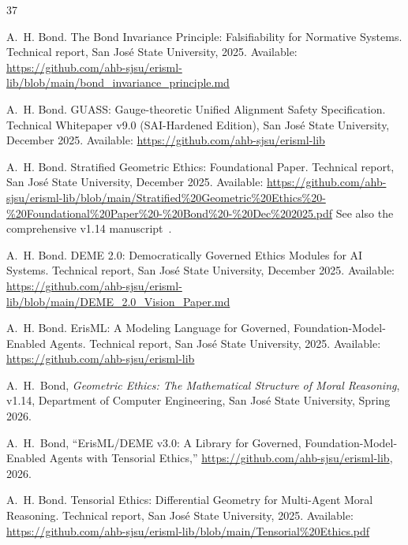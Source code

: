 \documentclass[12pt]{article}
\begin{document}
\begin{thebibliography}{37}

A.~H. Bond.
\newblock The Bond Invariance Principle: Falsifiability for Normative Systems.
\newblock Technical report, San Jos\'{e} State University, 2025.
\newblock Available: \url{https://github.com/ahb-sjsu/erisml-lib/blob/main/bond_invariance_principle.md}

A.~H. Bond.
\newblock GUASS: Gauge-theoretic Unified Alignment Safety Specification.
\newblock Technical Whitepaper v9.0 (SAI-Hardened Edition), San Jos\'{e} State University, December 2025.
\newblock Available: \url{https://github.com/ahb-sjsu/erisml-lib}

A.~H. Bond.
\newblock Stratified Geometric Ethics: Foundational Paper.
\newblock Technical report, San Jos\'{e} State University, December 2025.
\newblock Available: \url{https://github.com/ahb-sjsu/erisml-lib/blob/main/Stratified\%20Geometric\%20Ethics\%20-\%20Foundational\%20Paper\%20-\%20Bond\%20-\%20Dec\%202025.pdf}
\newblock See also the comprehensive v1.14 manuscript~\cite{bond2026ge}.

A.~H. Bond.
\newblock DEME 2.0: Democratically Governed Ethics Modules for AI Systems.
\newblock Technical report, San Jos\'{e} State University, December 2025.
\newblock Available: \url{https://github.com/ahb-sjsu/erisml-lib/blob/main/DEME_2.0_Vision_Paper.md}

A.~H. Bond.
\newblock ErisML: A Modeling Language for Governed, Foundation-Model-Enabled Agents.
\newblock Technical report, San Jos\'{e} State University, 2025.
\newblock Available: \url{https://github.com/ahb-sjsu/erisml-lib}

A.~H.~Bond, \emph{Geometric Ethics: The Mathematical Structure of Moral Reasoning}, v1.14, Department of Computer Engineering, San Jos\'e State University, Spring 2026.

A.~H.~Bond, ``ErisML/DEME v3.0: A Library for Governed, Foundation-Model-Enabled Agents with Tensorial Ethics,'' \url{https://github.com/ahb-sjsu/erisml-lib}, 2026.

A.~H. Bond.
\newblock Tensorial Ethics: Differential Geometry for Multi-Agent Moral Reasoning.
\newblock Technical report, San Jos\'{e} State University, 2025.
\newblock Available: \url{https://github.com/ahb-sjsu/erisml-lib/blob/main/Tensorial\%20Ethics.pdf}


\end{thebibliography}
\end{document}

